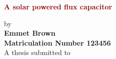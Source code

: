 \documentclass[twoside,11pt,titlepage,a4paper,english,bibliography=totocnumbered,listof=numbered]{scrbook}
\begin{document}
\frontmatter


\begin{titlepage}
	\strut
	\hfill
	\begin{center}
	\vspace{1cm}
		\Huge
		\begin{spacing}{.9}
			\textcolor{DarkRed}{\textbf{A solar powered flux capacitor}}\\
		\end{spacing}
		\vspace{0.8cm}
		\large
		by\\
		\vspace{0.8cm}
		\textbf{Emmet Brown}\\
		\vspace{0.8cm}
		\textbf{Matriculation Number 123456}\\
		\vspace{2cm}
	 	A thesis submitted to\\
		\vspace{0.5cm}

\end{center}
\end{titlepage}
\end{document}
